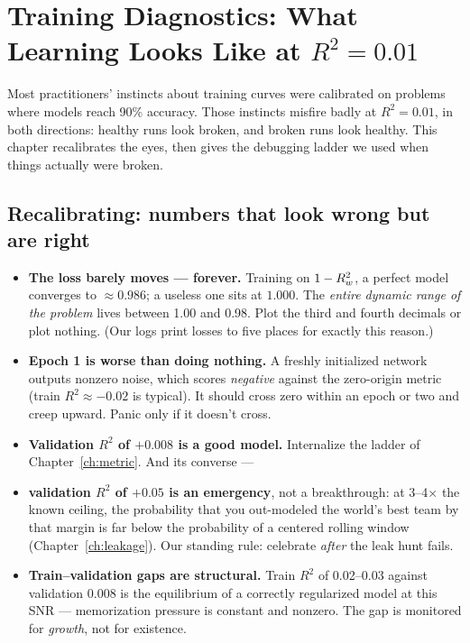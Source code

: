 \chapter[Training Diagnostics]{Training Diagnostics: What Learning Looks Like at
\texorpdfstring{$R^2 = 0.01$}{R2 = 0.01}}
\label{ch:diagnostics}

Most practitioners' instincts about training curves were calibrated on
problems where models reach 90\% accuracy. Those instincts misfire badly at
$R^2 = 0.01$, in both directions: healthy runs look broken, and broken runs
look healthy. This chapter recalibrates the eyes, then gives the debugging
ladder we used when things actually were broken.

\section{Recalibrating: numbers that look wrong but are right}

\begin{itemize}
\item \textbf{The loss barely moves --- forever.} Training on
  $1 - R^2_{w}$, a perfect model converges to $\approx 0.986$; a useless one
  sits at $1.000$. The \emph{entire dynamic range of the problem} lives
  between 1.00 and 0.98. Plot the third and fourth decimals or plot
  nothing. (Our logs print losses to five places for exactly this
  reason.)
\item \textbf{Epoch 1 is worse than doing nothing.} A freshly initialized
  network outputs nonzero noise, which scores \emph{negative} against the
  zero-origin metric (train $R^2 \approx -0.02$ is typical). It should
  cross zero within an epoch or two and creep upward. Panic only if it
  doesn't cross.
\item \textbf{Validation $R^2$ of $+0.008$ is a good model.} Internalize
  the ladder of Chapter~\ref{ch:metric}. And its converse ---
\item \textbf{validation $R^2$ of $+0.05$ is an emergency}, not a
  breakthrough: at 3--4$\times$ the known ceiling, the probability that
  you out-modeled the world's best team by that margin is far below the
  probability of a centered rolling window
  (Chapter~\ref{ch:leakage}). Our standing rule: celebrate \emph{after}
  the leak hunt fails.
\item \textbf{Train--validation gaps are structural.} Train $R^2$ of
  0.02--0.03 against validation 0.008 is the equilibrium of a correctly
  regularized model at this SNR --- memorization pressure is constant and
  nonzero. The gap is monitored for \emph{growth}, not for existence.
\end{itemize}

